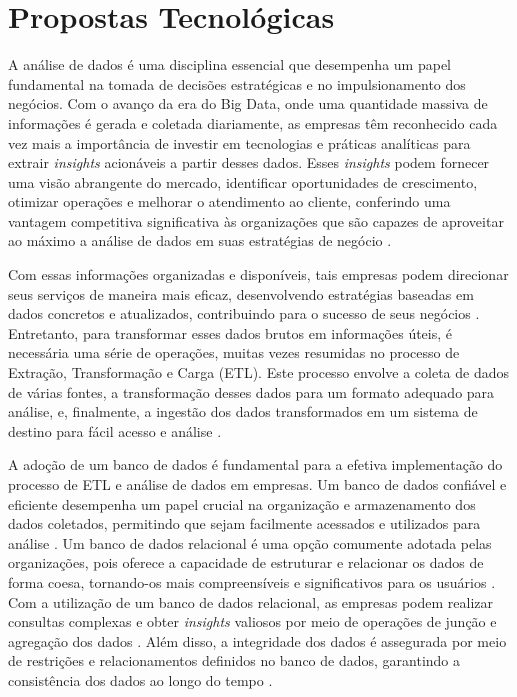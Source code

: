 \chapter{Propostas Tecnológicas}

A análise de dados é uma disciplina essencial que desempenha um papel fundamental na tomada de decisões estratégicas e no impulsionamento dos negócios. Com o avanço da era do Big Data, onde uma quantidade massiva de informações é gerada e coletada diariamente, as empresas têm reconhecido cada vez mais a importância de investir em tecnologias e práticas analíticas para extrair \textit{insights} acionáveis a partir desses dados. Esses \textit{insights} podem fornecer uma visão abrangente do mercado, identificar oportunidades de crescimento, otimizar operações e melhorar o atendimento ao cliente, conferindo uma vantagem competitiva significativa às organizações que são capazes de aproveitar ao máximo a análise de dados em suas estratégias de negócio \cite{mayer2013big, chen2012business, reddy2013data, watson2010current, white2012hadoop}.

Com essas informações organizadas e disponíveis, tais empresas podem direcionar seus serviços de maneira mais eficaz, desenvolvendo estratégias baseadas em dados concretos e atualizados, contribuindo para o sucesso de seus negócios \cite{chen2012business}.
Entretanto, para transformar esses dados brutos em informações úteis, é necessária uma série de operações, muitas vezes resumidas no processo de Extração, Transformação e Carga (ETL). Este processo envolve a coleta de dados de várias fontes, a transformação desses dados para um formato adequado para análise, e, finalmente, a ingestão dos dados transformados em um sistema de destino para fácil acesso e análise \cite{vassiliadis2002}.

A adoção de um banco de dados é fundamental para a efetiva implementação do processo de ETL e análise de dados em empresas. Um banco de dados confiável e eficiente desempenha um papel crucial na organização e armazenamento dos dados coletados, permitindo que sejam facilmente acessados e utilizados para análise \cite{elmasri2019fundamentals}. Um banco de dados relacional é uma opção comumente adotada pelas organizações, pois oferece a capacidade de estruturar e relacionar os dados de forma coesa, tornando-os mais compreensíveis e significativos para os usuários \cite{date2003introduction}. Com a utilização de um banco de dados relacional, as empresas podem realizar consultas complexas e obter \textit{insights} valiosos por meio de operações de junção e agregação dos dados \cite{connolly2014}. Além disso, a integridade dos dados é assegurada por meio de restrições e relacionamentos definidos no banco de dados, garantindo a consistência dos dados ao longo do tempo \cite{silberschatz2019database}.


